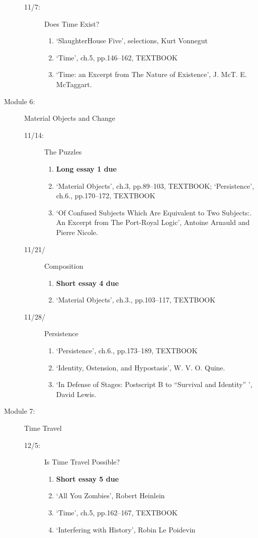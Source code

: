 \documentclass[article,oneside]{memoir}
\begin{document}
\begin{description}
\begin{description}
\item[11/7:] Does Time Exist?
\begin{enumerate}
\item `SlaughterHouse Five', selections, Kurt Vonnegut
\item `Time', ch.5, pp.146--162, TEXTBOOK
\item `Time: an Excerpt from The Nature of Existence', J. McT. E. McTaggart.
\end{enumerate}
\end{description}

\item[Module 6:] Material Objects and Change
\begin{description}
\item[11/14:] The Puzzles 
\begin{enumerate}
\item \textbf{Long essay 1 due}

\item `Material Objects', ch.3, pp.89--103, TEXTBOOK; `Persistence', ch.6., pp.170--172, TEXTBOOK
\item `Of Confused Subjects Which Are Equivalent to Two Subjects:. An Excerpt from The Port-Royal Logic', Antoine Arnauld and Pierre Nicole. 
\end{enumerate}
\item[11/21/] Composition 
\begin{enumerate}
\item \textbf{Short essay 4 due}
\item `Material Objects', ch.3., pp.103--117, TEXTBOOK
\end{enumerate}
\item[11/28/] Persistence
\begin{enumerate}
\item `Persistence', ch.6., pp.173--189, TEXTBOOK
 \item `Identity, Ostension, and Hypostasis', W. V. O. Quine.
\item `In Defense of Stages: Postscript B to ``Survival and Identity'' ', David Lewis.
\end{enumerate}
\end{description}
\item[Module 7:] Time Travel
\begin{description}
\item[12/5:] Is Time Travel Possible?
\begin{enumerate}
\item \textbf{Short essay 5 due}
\item `All You Zombies', Robert Heinlein 
\item `Time', ch.5, pp.162--167, TEXTBOOK
\item `Interfering with History', Robin Le Poidevin 
\end{enumerate}


\end{description}
\end{description}
\end{document}
